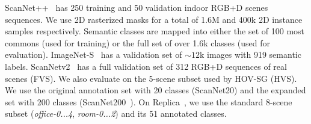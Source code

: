 ScanNet++~\cite{yeshwanthliu2023scannetpp} has 250 training and 50 validation indoor RGB+D scenes sequences. We use 2D rasterized masks for a total of 1.6M and 400k 2D instance samples respectively. Semantic classes are mapped into either the set of 100 most commons (used for training) or the full set of over 1.6k classes (used for evaluation).
ImageNet-S~\cite{gao2022luss} has a validation set of $\sim\!12$k images with 919 semantic labels. %
ScanNetv2~\cite{dai2017scannet} has a full validation set of 312 RGB+D sequences of real scenes (FVS). We also evaluate on the 5-scene subset used by HOV-SG (HVS). We use the original annotation set with 20 classes (ScanNet20) and the expanded set with 200 classes (ScanNet200~\cite{rozenberszki2022language}).
On Replica~\cite{replica19arxiv}, we use the standard 8-scene subset (\textit{office-0...4}, \textit{room-0...2}) and its 51 annotated classes.
